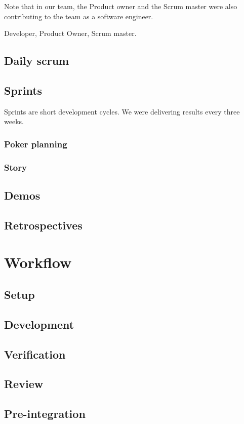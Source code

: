 Note that in our team, the Product owner and the Scrum master were also contributing to the team as a software engineer.

Developer, Product Owner, Scrum master.
\subsection{Daily scrum}

\subsection{Sprints}\label{sec:sprint}
Sprints are short development cycles. We were delivering results every three weeks.

\subsubsection{Poker planning}

\subsubsection{Story}\label{sec:story}

\subsection{Demos}
\subsection{Retrospectives}

\section{Workflow}
\subsection{Setup}
\subsection{Development}
\subsection{Verification}
\subsection{Review}
\subsection{Pre-integration}
